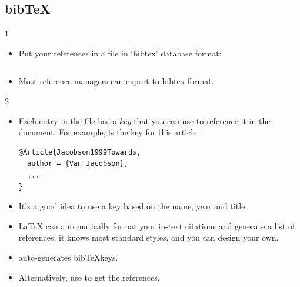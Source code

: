 \documentclass[10pt,times]{beamer}
\begin{document}
\subsection{bib\TeX}
\begin{frame}[fragile]{\insertsubsection{} 1}
\begin{itemize}
\item Put your references in a  file in `bibtex' database format:
\inputminted[fontsize=\scriptsize,frame=single]{latex}{bib-example.bib}
\item Most reference managers can export to bibtex format.
\end{itemize}
\end{frame}


\begin{frame}[fragile]{\insertsubsection{} 2}
\begin{itemize}
\item Each entry in the  file has a \emph{key} that you can use to
reference it in the document. For example,  is the 
key for this article:
\begin{verbatim}
@Article{Jacobson1999Towards,
  author = {Van Jacobson},
  ...
}
\end{verbatim}
\item It's a good idea to use a key based on the name, year and title.
\item \LaTeX{} can automatically format your in-text citations and generate a
list of references; it knows most standard styles, and you can design your own.
\item {} auto-generates bib\TeX keys.
\item Alternatively, use  to get the references.
\end{itemize}
\end{frame}
\end{document}
